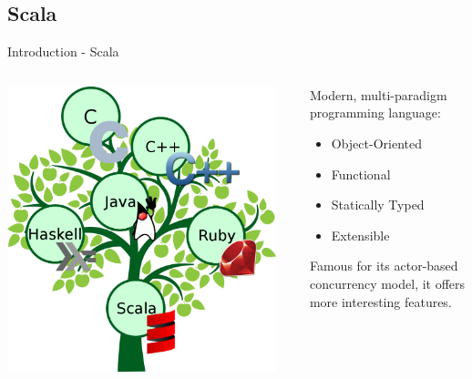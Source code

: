 \documentclass{beamer}
\begin{document}
\subsection{Scala}
\begin{frame}{Introduction - Scala}
  \begin{columns}[onlytextwidth]
    \begin{column}{0.6\textwidth}
      \includegraphics[width=0.95\textwidth]{images/scala-tree}
    \end{column}
    \begin{column}{0.4\textwidth}
     Modern, multi-paradigm programming language:
     \begin{itemize}
      \item Object-Oriented
      \item Functional
      \item Statically Typed
      \item Extensible
     \end{itemize}
     Famous for its actor-based concurrency model, it offers more
     interesting features.
    \end{column}
  \end{columns}
\end{frame}


\end{document}
